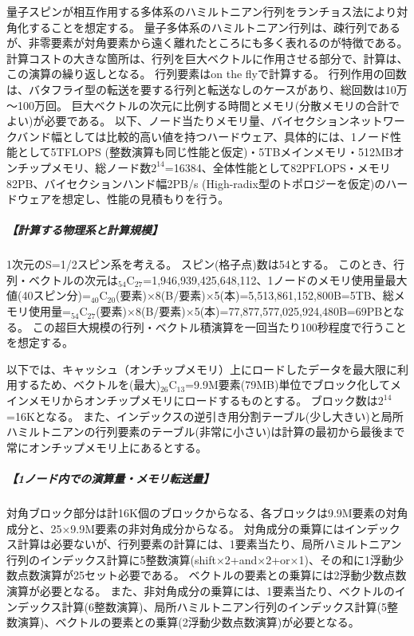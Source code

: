 \label{sec:4-2_要求性能_厳密対角化}
量子スピンが相互作用する多体系のハミルトニアン行列をランチョス法により対角化することを想定する。
量子多体系のハミルトニアン行列は、疎行列であるが、非零要素が対角要素から遠く離れたところにも多く表れるのが特徴である。
計算コストの大きな箇所は、行列を巨大ベクトルに作用させる部分で、計算は、この演算の繰り返しとなる。
行列要素はon the flyで計算する。
行列作用の回数は、バタフライ型の転送を要する行列と転送なしのケースがあり、総回数は10万～100万回。
巨大ベクトルの次元に比例する時間とメモリ(分散メモリの合計でよい)が必要である。
以下、ノード当たりメモリ量、バイセクションネットワークバンド幅としては比較的高い値を持つハードウェア、具体的には、1ノード性能として5TFLOPS (整数演算も同じ性能と仮定)・5TBメインメモリ・512MBオンチップメモリ、総ノード数$2^{14}$=16384、全体性能として82PFLOPS・メモリ82PB、バイセクションハンド幅2PB/s (High-radix型のトポロジーを仮定)のハードウェアを想定し、性能の見積もりを行う。

\subparagraph{【計算する物理系と計算規模】}
1次元のS=1/2スピン系を考える。
スピン(格子点)数は54とする。
このとき、行列・ベクトルの次元は${}_{54}\mathrm{C}_{27}$=1,946,939,425,648,112、1ノードのメモリ使用量最大値(40スピン分)=${}_{40}\mathrm{C}_{20}$(要素)×8(B/要素)×5(本)=5,513,861,152,800B=5TB、総メモリ使用量=${}_{54}\mathrm{C}_{27}$(要素)×8(B/要素)×5(本)=77,877,577,025,924,480B=69PBとなる。
この超巨大規模の行列・ベクトル積演算を一回当たり100秒程度で行うことを想定する。

以下では、キャッシュ（オンチップメモリ）上にロードしたデータを最大限に利用するため、ベクトルを(最大)${}_{26}\mathrm{C}_{13}$=9.9M要素(79MB)単位でブロック化してメインメモリからオンチップメモリにロードするものとする。
ブロック数は$2^{14}$=16Kとなる。
また、インデックスの逆引き用分割テーブル(少し大きい)と局所ハミルトニアンの行列要素のテーブル(非常に小さい)は計算の最初から最後まで常にオンチップメモリ上にあるとする。

\subparagraph{【1ノード内での演算量・メモリ転送量】}
対角ブロック部分は計16K個のブロックからなる、各ブロックは9.9M要素の対角成分と、25×9.9M要素の非対角成分からなる。
対角成分の乗算にはインデックス計算は必要ないが、行列要素の計算には、1要素当たり、局所ハミルトニアン行列のインデックス計算に5整数演算(shift×2+and×2+or×1)、その和に1浮動少数点数演算が25セット必要である。
ベクトルの要素との乗算には2浮動少数点数演算が必要となる。
また、非対角成分の乗算には、1要素当たり、ベクトルのインデックス計算(6整数演算)、局所ハミルトニアン行列のインデックス計算(5整数演算)、ベクトルの要素との乗算(2浮動少数点数演算)が必要となる。

